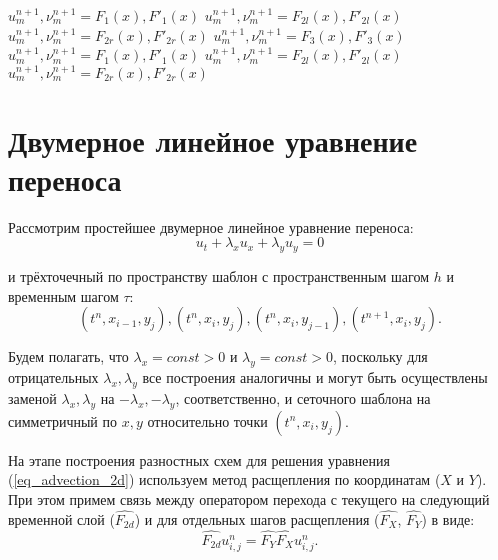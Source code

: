 \documentclass[11pt]{article}
\begin{document}
\fi


\begin{algorithm}
\begin{algorithmic}[1]
\State $u_m^{n+1}, \nu_m^{n+1} = F_1(x), F'_1(x)$
\Else
{}
\State $u_m^{n+1}, \nu_m^{n+1} = F_{2l}(x), F'_{2l}(x)$
\Else
\State $u_m^{n+1}, \nu_m^{n+1} = F_{2r}(x), F'_{2r}(x)$
\EndIf
\EndIf
\Else
\State $u_m^{n+1}, \nu_m^{n+1} = F_3(x), F'_3(x)$
\EndIf
{}
\State $u_m^{n+1},  \nu_m^{n+1} = F_1(x), F'_1(x)$
\Else
{}
\State $u_m^{n+1}, \nu_m^{n+1} = F_{2l}(x), F'_{2l}(x)$
\Else
\State $u_m^{n+1}, \nu_m^{n+1} = F_{2r}(x), F'_{2r}(x)$
\EndIf
\EndIf
\end{algorithmic}
\end{algorithm}

\section{Двумерное линейное уравнение переноса}

Рассмотрим простейшее двумерное линейное уравнение переноса:
\begin{equation}
\label{eq_advection_2d}
u_t + \lambda_x u_x + \lambda_y u_y = 0
\end{equation}

и трёхточечный по пространству шаблон с пространственным шагом $h$ и временным шагом $\tau$:\begin{equation}
\label{eq_stencil_4}
(t^n, x_{i - 1}, y_j), (t^n, x_i, y_j), (t^n, x_i, y_{j - 1}), (t^{n + 1}, x_i, y_j).
\end{equation}

Будем полагать, что $\lambda_x = const > 0$ и $\lambda_y = const > 0$, поскольку для отрицательных $\lambda_x, \lambda_y$ все построения аналогичны и могут быть осуществлены заменой $\lambda_x, \lambda_y$ на $-\lambda_x, -\lambda_y$, соответственно, и сеточного шаблона на симметричный по $x, y$ относительно точки $(t^n, x_i, y_j)$.

На этапе построения разностных схем для решения уравнения (\ref{eq_advection_2d}) используем метод расщепления по координатам ($X$ и $Y$).
При этом примем связь между оператором перехода с текущего на следующий временной слой ($\hat{F_{2d}}$)
 и для отдельных шагов расщепления ($\hat{F_X}$, $\hat{F_Y}$) в виде:
\begin{equation}
\label{eq_operators}
\hat{F_{2d}} u^n_{i,j} = \hat{F_Y} \hat{F_X} u^n_{i,j}.
\end{equation}
\end{document}
